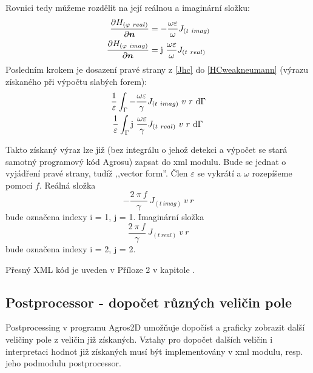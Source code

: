 \documentclass[12pt,a4paper,oneside]{article}
\numberwithin{equation}{section} %
\numberwithin{figure}{section} %
\numberwithin{table}{section} %
\newcommand{\mj}{\mathrm{j}} %
\renewcommand{\vec}[1]{\mbox{\boldmath$#1$}} %
\begin{document}
Rovnici tedy můžeme rozdělit na její reálnou a imaginární složku:
\begin{subequations}
\label{Jhc}
\begin{align}
\frac{\partial H _{(\varphi ~real)}}{\partial \vec{n}} &= - \frac{\omega \varepsilon}{\omega}  J _{(t~imag)}
\\
\frac{\partial H _{(\varphi ~imag)}}{\partial \vec{n}} &= \mj ~ \frac{\omega \varepsilon}{\omega} J _{(t~real)}
\end{align}
\end{subequations}
Posledním krokem je dosazení pravé strany z \ref{Jhc} do \ref{HCweakneumann} (výrazu získaného při výpočtu slabých forem):
\begin{subequations}
\begin{align}
\frac{1}{\varepsilon} \int _{\Gamma} - \frac{\omega \varepsilon}{\gamma} J _{(t~imag)} ~ v ~ r ~ \ud \Gamma
\\
\frac{1}{\varepsilon} \int _{\Gamma} \mj ~ \frac{\omega \varepsilon}{\gamma} J _{(t~real)} ~ v ~ r ~ \ud \Gamma ~
\end{align}
\end{subequations}

Takto získaný výraz lze již (bez integrálu o jehož detekci a výpočet se stará samotný programový kód Agrosu) zapsat do xml modulu. Bude se jednat o vyjádření pravé strany, tudíž ,,vector form''. Člen $\varepsilon$ se vykrátí a $\omega$ rozepíšeme pomocí $f$. Reálná složka  
\begin{equation}
- \frac{2 ~ \pi ~ f}{\gamma} ~ J_{(t~imag)} ~ v ~ r
\end{equation} 
bude označena indexy i = 1, j = 1. Imaginární složka 
\begin{equation}
\frac{2 ~ \pi ~ f}{\gamma} ~ J_{(t~real)} ~ v ~ r
\end{equation}
bude označena indexy i = 2, j = 2.

Přesný XML kód je uveden v Příloze 2 v kapitole .




\subsection{Postprocessor - dopočet různých veličin pole}
Postprocessing v programu Agros2D umožňuje dopočíst a graficky zobrazit další veličiny pole z veličin již získaných. Vztahy pro dopočet dalších veličin i interpretaci hodnot již získaných musí být implementovány v xml modulu, resp. jeho podmodulu postprocessor.
\end{document}
